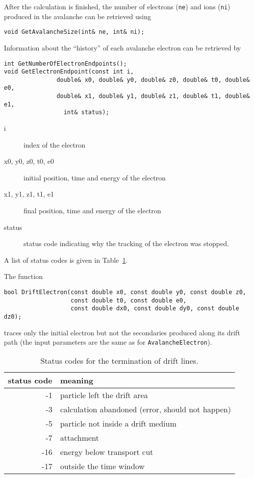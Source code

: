After the calculation is finished, the number of electrons 
(\texttt{ne}) and ions (\texttt{ni})  
produced in the avalanche can be retrieved using
\begin{lstlisting}
void GetAvalancheSize(int& ne, int& ni);
\end{lstlisting}
Information about the ``history'' of each avalanche electron can be 
retrieved by
\begin{lstlisting}
int GetNumberOfElectronEndpoints();
void GetElectronEndpoint(const int i, 
               double& x0, double& y0, double& z0, double& t0, double& e0,
               double& x1, double& y1, double& z1, double& t1, double& e1,
                 int& status); 
\end{lstlisting}
\begin{description}
  \item[i] index of the electron
  \item[x0, y0, z0, t0, e0] initial position, time and energy of the electron
  \item[x1, y1, z1, t1, e1] final position, time and energy of the electron
  \item[status] status code indicating why the tracking of the electron was stopped.  
\end{description}
A list of status codes is given in Table~\ref{Tab:DriftLineStatusCodes}.

The function
\begin{lstlisting}
bool DriftElectron(const double x0, const double y0, const double z0,
                   const double t0, const double e0,
                   const double dx0, const double dy0, const double dz0);
\end{lstlisting}
traces only the initial electron but not the secondaries 
produced along its drift path 
(the input parameters are the same as for \texttt{AvalancheElectron}).

\begin{table}
  \centering
  \begin{tabular}{r l}
    \toprule
    status code &  meaning\\
    \midrule
     -1 & particle left the drift area        \\
     -3 & calculation abandoned (error, should not happen) \\
     -5 & particle not inside a drift medium  \\
     -7 & attachment                          \\
    -16 & energy below transport cut          \\
    -17 & outside the time window             \\
    \bottomrule
  \end{tabular}
  \caption{Status codes for the termination of drift lines.}
  \label{Tab:DriftLineStatusCodes}
\end{table}

